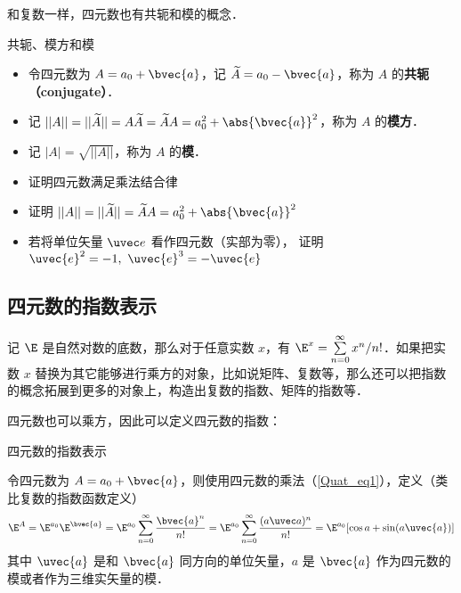 和复数一样，四元数也有共轭和模的概念．

\begin{definition}{共轭、模方和模}
\begin{itemize}
\item 令四元数为 $A=a_0+\bvec{a}$，记 $\widetilde{A}=a_0-\bvec{a}$，称为 $A$ 的\textbf{共轭（conjugate）}．
\item 记 $||A||=||\widetilde{A}||=A\widetilde{A}=\widetilde{A}A=a_0^2+ \abs{\bvec{a}}^2$，称为 $A$ 的\textbf{模方}．
\item 记 $|A|=\sqrt{||A||}$，称为 $A$ 的\textbf{模}．
\end{itemize}
\end{definition}

\begin{exercise}{}\label{Quat_exe1}
\begin{itemize}
\item 证明四元数满足乘法结合律
\item 证明 $||A||=||\widetilde{A}||=\widetilde{A}A=a_0^2 + \abs{\bvec{a}}^2$
\item 若将单位矢量 $\uvec e$ 看作四元数（实部为零）， 证明 $\uvec{e}^2=-1,\ \uvec{e}^3=-\uvec{e}$
\end{itemize}
\end{exercise}

\subsection{四元数的指数表示}

记 $\E$ 是自然对数的底数，那么对于任意实数 $x$，有 $\E^x = \sum^\infty\limits_{n=0} x^n / n!$．如果把实数 $x$ 替换为其它能够进行乘方的对象，比如说矩阵、复数等，那么还可以把指数的概念拓展到更多的对象上，构造出复数的指数、矩阵的指数等．

四元数也可以乘方，因此可以定义四元数的指数：

\begin{definition}{四元数的指数表示}

令四元数为 $A=a_0+\bvec{a}$，则使用四元数的乘法（\autoref{Quat_eq1}），定义（类比复数的指数函数定义）
\begin{equation}
\E^A=\E^{a_0}\E^{\bvec{a}}=\E^{a_0}\sum^\infty\limits_{n=0}\frac{\bvec{a}^n}{n!}=\E^{a_0}\sum^\infty\limits_{n=0}\frac{(a \uvec a)^n}{n!}=\E^{a_0}[\cos{a}+\sin({a}\uvec{a})]
\end{equation}
其中 $\uvec{a}$ 是和 $\bvec{a}$ 同方向的单位矢量，$a$ 是 $\bvec{a}$ 作为四元数的模或者作为三维实矢量的模．
\end{definition}

